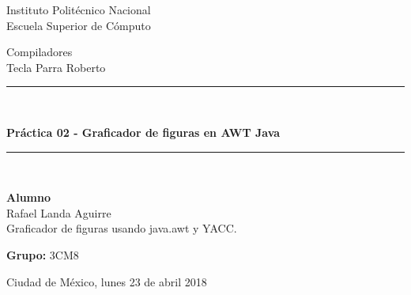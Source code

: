 \begin{center}
	\vspace*{0.0in}
	\begin{large}
		Instituto Politécnico Nacional\\                %
		\vspace*{0.2in}
		Escuela Superior de Cómputo\\                   %
		\vspace*{0.8in}
		
	\end{large}
	\begin{large}
		Compiladores \\	                       			%
		\vspace*{0.2in}
		Tecla Parra Roberto\\                 			%
		\vspace*{0.8in}
		
	\end{large}
	\rule{150mm}{0.1mm}\\
	\vspace*{0.2in}
	\begin{Large}
		\textbf{Práctica 02 - Graficador de 
			figuras en AWT Java} \\     					%
        \vspace*{0.2in}
        
	\end{Large}
	\vspace*{0.2in}
	\rule{150mm}{0.1mm}\\
	\begin{large}
		\vspace*{0.3in}
		
		\textbf{Alumno} \\
		Rafael Landa Aguirre\\
		Graficador de figuras usando java.awt 
		y YACC.\\
	\end{large}
	\begin{large}
		\vspace*{0.2in}
		\textbf{Grupo:} 3CM8 \\
		\vspace*{0.4in}
		
		Ciudad de México, lunes 23 de abril 2018\\     %
	\end{large}
\end{center}